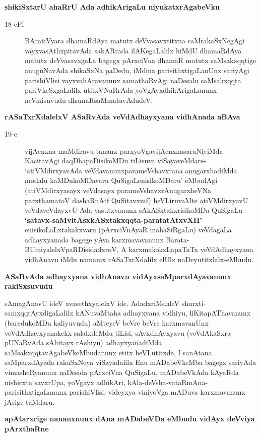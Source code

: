 {\noindent
{\large\bf shikiSxtarU ahaRrU Ada adhikArigaLu niyukatxrAgabeVku}}
\begin{description}
\item[18-ePf] BAratiVyara dhamaRdAya matutx deVvasavxtitxna saMrakaSxNe\-gAgi vayxvasAthxpitavAda sakAR\-rada ilAKegaLalilx hiMdU dhamaRdAya matutx deVvasavxgaLa bagegx pArxciVna dhamaR matutx saMsakxqq\-tige anuguNavAda shikaSxNa paDedu, iMdina parisithxtigaLanUnx sariyAgi parishiVlisi vayxva\-hAra\-vanunx samathaRvAgi naDesalu saMsakxqqta pariVkeSxgaLalilx utitxVNaRrAda yoVgAyxdhikArigaLanunx neVmisu\-vudu dhamaRsaMmatavAdudeV.
\end{description}
{\noindent
{\large\bf rASaTxrXdalelxV ASaRvAda veVdAdhayxyana vidhAnada aBAva}}\label{page47}
\begin{description}
\item[19-e] vijAcnxna maMdiravu tananx parxyoVgavijAcnxnasaraNiyiMda KacitavAgi daqDha\-paDisikoMDu tiLisuva viSayaveMdare- `atiVMdirxyavAda veVdavanunx\break parameVshavxrana anugarxhadiMda modalu kaMDu\-koMDavaru QuSigaLenisi\break\-koMDaru' eMbudAgi (atiVMdirxyasayx veVdasayx\label{47} parameVshavxrAnu\-garxheVNa parxthamatoV dashaRnAtf QuSitavxmf) heVLiruvaMte atiVMdirxyavU veVda\-veVdayxvU Ada vasutx\-vanunx sAkASxtakxrisikoMDa QuSigaLu - {\bf `satavx-saMvitAsxkASx\-takxqqta-paratatAtxvXH'\label{48}} enisikoLaLxtakakxvaru (pArx\-ciV\-nAyaR mahaSiRgaLu) veVdagaLa adhayxyanada bagege yAva karxmavavanunx Barata-BUmi\-yalelxV\-paR\-Disi\-dadxroV, A karxmakokxLapaTaTx veVdAdhayxyana vidhAnavu iMdu namamx rASaTxrXdalilx elUlx naDeyutitxlalx-eMbudu.
\end{description}
{\noindent
{\large\bf ASaRvAda adhayxyana vidhAnavu vidAyxsaMparxdAyavanunx rakiSxsuvudu}}\label{page48}
\medskip

\noindent
sAmagAnavU ideV avasethxyalelxV ide. AdadxriMdaleV shurxti-samxqqtAyxdigaLalilx kANu\-vaMtaha adhayxyana vidhiyu, liKitapAThavanunx (baredukoMDu kaliyuvudu) aMteyeV beVre beVre karxmavanUnx veVdA\-dhayxya\-nakekx salalx\-deMdu tiLisi, sAvxdhAyxyavu (veVdAkaSxra pUNaRvAda sAhitayx rAshiyu) adhayxyanadiMda saMsakxqqta\-vAga\-beVkeMbu\-danunx etitx heVLutitxde. I sanAtana saMparxdAyada rakaSxNeya viSayadalilx Enu mADa\-beVkeMba bagegx sariyAda vimasheRyanunx naDesida pArxciVna QuSigaLu, mADabeVkAda kAyaRda nishicxta savxrUpa, yoVgayx adhikAri, kAla-deVsha-vataRmAna- parisithxtigaLanunx parishiVlisi, videyxya vini\-yoVga mA\-Duva karxma\-vanunx jArige taMdaru.

{\bigskip
\noindent
{\large\bf apAtarxrige nananxnunx dAna mADabeVDa eMbudu vidAyx deVviya pArxthaRne}}\label{page48}
\medskip

